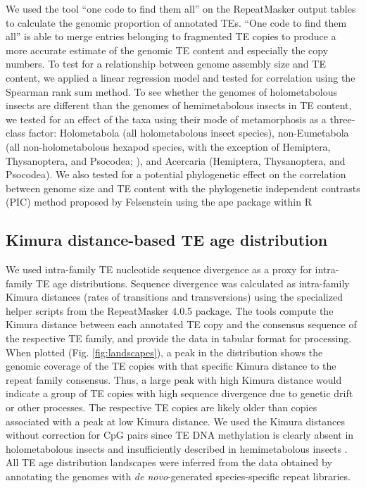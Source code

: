 We used the tool ``one code to find them all'' \citep{Bailly-Bechet2014} on the
RepeatMasker output tables to calculate the genomic proportion of
annotated TEs. ``One code to find them all'' is able to merge entries
belonging to fragmented TE copies to produce a more accurate estimate of
the genomic TE content and especially the copy numbers. To test for a
relationship between genome assembly size and TE content, we applied a
linear regression model and tested for correlation using the Spearman
rank sum method. To see whether the genomes of holometabolous insects
are different than the genomes of hemimetabolous insects in TE content,
we tested for an effect of the taxa using their mode of metamorphosis as
a three-class factor: Holometabola (all holometabolous insect species),
non-Eumetabola (all non-holometabolous hexapod species, with the
exception of Hemiptera, Thysanoptera, and Psocodea; \citep{Beutel2013}),
and Acercaria (Hemiptera, Thysanoptera, and Psocodea). We also tested
for a potential phylogenetic effect on the correlation between genome
size and TE content with the phylogenetic independent contrasts (PIC)
method proposed by Felsenstein \citep{Felsenstein1985} using the ape package
\citep{Paradis2004} within R \citep{RCoreTeam2017}





\subsection{Kimura distance-based TE age
distribution}

We used intra-family TE nucleotide sequence divergence as a proxy for
intra-family TE age distributions. Sequence divergence was calculated as
intra-family Kimura distances (rates of transitions and transversions)
using the specialized helper scripts from the RepeatMasker 4.0.5
package. The tools compute the Kimura distance between each annotated TE
copy and the consensus sequence of the respective TE family, and provide
the data in tabular format for processing. When plotted (Fig. \ref{fig:landscapes}), a peak
in the distribution shows the genomic coverage of the TE copies with
that specific Kimura distance to the repeat family consensus. Thus, a
large peak with high Kimura distance would indicate a group of TE copies
with high sequence divergence due to genetic drift or other processes.
The respective TE copies are likely older than copies associated with a
peak at low Kimura distance. We used the Kimura distances without
correction for CpG pairs since TE DNA methylation is clearly absent in
holometabolous insects and insufficiently described in hemimetabolous
insects \citep{Glastad2014}. All TE age distribution landscapes were
inferred from the data obtained by annotating the genomes with \emph{de
novo}-generated species-specific repeat libraries.


